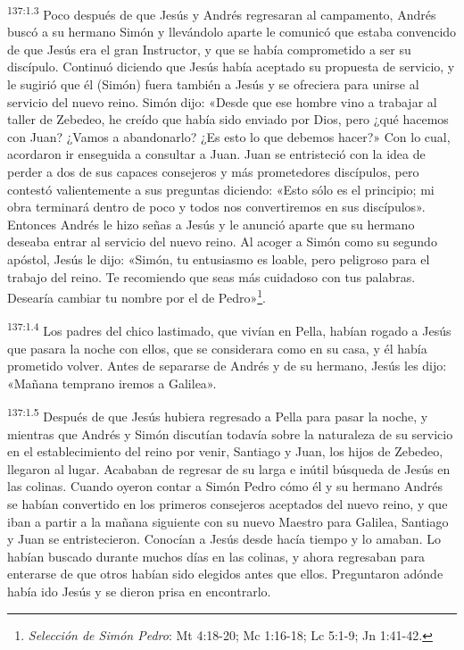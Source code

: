 \par
\textsuperscript{137:1.3} Poco después de que Jesús y Andrés regresaran al campamento, Andrés buscó a su hermano Simón y llevándolo aparte le comunicó que estaba convencido de que Jesús era el gran Instructor, y que se había comprometido a ser su discípulo. Continuó diciendo que Jesús había aceptado su propuesta de servicio, y le sugirió que él (Simón) fuera también a Jesús y se ofreciera para unirse al servicio del nuevo reino. Simón dijo: «Desde que ese hombre vino a trabajar al taller de Zebedeo, he creído que había sido enviado por Dios, pero ¿qué hacemos con Juan? ¿Vamos a abandonarlo? ¿Es esto lo que debemos hacer?» Con lo cual, acordaron ir enseguida a consultar a Juan. Juan se entristeció con la idea de perder a dos de sus capaces consejeros y más prometedores discípulos, pero contestó valientemente a sus preguntas diciendo: «Esto sólo es el principio; mi obra terminará dentro de poco y todos nos convertiremos en sus discípulos». Entonces Andrés le hizo señas a Jesús y le anunció aparte que su hermano deseaba entrar al servicio del nuevo reino. Al acoger a Simón como su segundo apóstol, Jesús le dijo: «Simón, tu entusiasmo es loable, pero peligroso para el trabajo del reino. Te recomiendo que seas más cuidadoso con tus palabras. Desearía cambiar tu nombre por el de Pedro»\footnote{\textit{Selección de Simón Pedro}: Mt 4:18-20; Mc 1:16-18; Lc 5:1-9; Jn 1:41-42.}.

\par
\textsuperscript{137:1.4} Los padres del chico lastimado, que vivían en Pella, habían rogado a Jesús que pasara la noche con ellos, que se considerara como en su casa, y él había prometido volver. Antes de separarse de Andrés y de su hermano, Jesús les dijo: «Mañana temprano iremos a Galilea».

\par
\textsuperscript{137:1.5} Después de que Jesús hubiera regresado a Pella para pasar la noche, y mientras que Andrés y Simón discutían todavía sobre la naturaleza de su servicio en el establecimiento del reino por venir, Santiago y Juan, los hijos de Zebedeo, llegaron al lugar. Acababan de regresar de su larga e inútil búsqueda de Jesús en las colinas. Cuando oyeron contar a Simón Pedro cómo él y su hermano Andrés se habían convertido en los primeros consejeros aceptados del nuevo reino, y que iban a partir a la mañana siguiente con su nuevo Maestro para Galilea, Santiago y Juan se entristecieron. Conocían a Jesús desde hacía tiempo y lo amaban. Lo habían buscado durante muchos días en las colinas, y ahora regresaban para enterarse de que otros habían sido elegidos antes que ellos. Preguntaron adónde había ido Jesús y se dieron prisa en encontrarlo.

